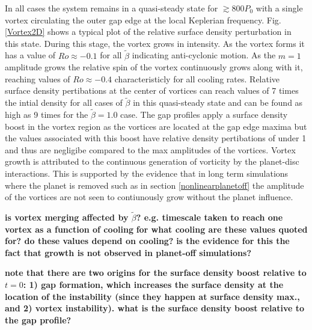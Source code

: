 In all cases the system remains in a quasi-steady state for
$\gtrsim800P_0$ with a single vortex circulating 
the outer gap edge at the local Keplerian  
frequency. Fig. \ref{Vortex2D} shows a typical plot of the relative 
surface density perturbation in this state. During this stage, the 
vortex grows in intensity. As the vortex forms it has a
 value of $Ro\approx-0.1$ for all $\tilde\beta$
 indicating anti-cyclonic
motion. As the $m=1$ amplitude grows the relative spin of the vortex
continuously grows along with it, reaching values of
$Ro\approx-0.4$ characteristicly for all cooling rates. Relative surface
 density pertibations at the center of vortices can reach values of 7 times the
 intial density for all cases of $\tilde\beta$ in this quasi-steady state and
 can be found as high as 9 times for the $\tilde\beta=1.0$ case.
 The gap profiles apply a surface density boost in the vortex region as the
 vortices are located at the gap edge maxima
 but the values associated with this boost have relative density pertibations
 of under 1 and thus are negligibe compared to the max amplitudes of the vortices.
 Vortex growth is attributed to
the continuous generation of vorticity by the planet-disc interactions. 
This is supported by the evidence that in long term simulations where the
planet is removed such as in section \ref{nonlinearplanetoff} the amplitude of
 the vortices are not seen to contiunously grow without the planet influence.


{\bf is vortex merging affected by $\tilde{\beta}$? e.g. timescale
  taken to reach one vortex as a function of cooling}
{\bf for what cooling are these values quoted for? do
  these values depend on cooling?}
 {\bf is the evidence for this the fact that growth is not observed in
  planet-off simulations?}   

{\bf note that there
  are two origins for the surface density boost relative to $t=0$: 1) gap
  formation, which increases the surface density at the location of
  the instability (since they happen at surface density max., and 2)
  vortex instability). what is the surface density boost relative to
  the gap profile?}   


